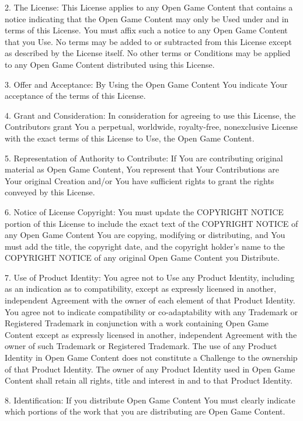 \documentclass[letterpaper,twocolumn,openany,nodeprecatedcode]{dndbook}
\begin{document}
2. The License: This License applies to any Open Game Content that contains a notice indicating that the Open Game Content may only be Used under and in terms of this License. You must affix such a notice to any Open Game Content that you Use. No terms may be added to or subtracted from this License except as described by the License itself. No other terms or Conditions may be applied to any Open Game Content distributed using this License.

3. Offer and Acceptance: By Using the Open Game Content You indicate Your acceptance of the terms of this License.

4. Grant and Consideration: In consideration for agreeing to use this License, the Contributors grant You a perpetual, worldwide, royalty-free, nonexclusive License with the exact terms of this License to Use, the Open Game Content.

5. Representation of Authority to Contribute: If You are contributing original material as Open Game Content, You represent that Your Contributions are Your original Creation and/or You have sufficient rights to grant the rights conveyed by this License.

6. Notice of License Copyright: You must update the COPYRIGHT NOTICE portion of this License to include the exact text of the COPYRIGHT NOTICE of any Open Game Content You are copying, modifying or distributing, and You must add the title, the copyright date, and the copyright holder’s name to the COPYRIGHT NOTICE of any original Open Game Content you Distribute.

7. Use of Product Identity: You agree not to Use any Product Identity, including as an indication as to compatibility, except as expressly licensed in another, independent Agreement with the owner of each element of that Product Identity. You agree not to indicate compatibility or co-adaptability with any Trademark or Registered Trademark in conjunction with a work containing Open Game Content except as expressly licensed in another, independent Agreement with the owner of such Trademark or Registered Trademark. The use of any Product Identity in Open Game Content does not constitute a Challenge to the ownership of that Product Identity. The owner of any Product Identity used in Open Game Content shall retain all rights, title and interest in and to that Product Identity.

8. Identification: If you distribute Open Game Content You must clearly indicate which portions of the work that you are distributing are Open Game Content.
\end{document}
